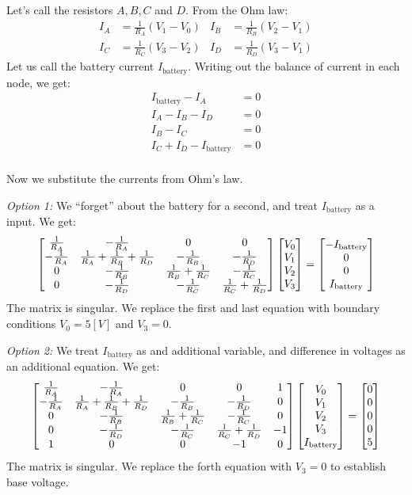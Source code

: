 \documentclass[12pt,class=article,crop=false,preview=false]{standalone}
\begin{document}
\begin{solution}
Let's call the resistors $A,B,C$ and $D$. From the Ohm law:
\begin{align*}
I_A &= \frac{1}{R_A}\left(V_1 - V_0\right) & I_B &= \frac{1}{R_B}\left(V_2 - V_1\right)\\
I_C &= \frac{1}{R_C}\left(V_3 - V_2\right) & I_D &= \frac{1}{R_D}\left(V_3 - V_1\right)
\end{align*}
Let us call the battery current $I_\text{battery}$. Writing out the balance of current in each node, we get:
\begin{align*}
I_\text{battery} - I_A &= 0\\
I_A - I_B - I_D &= 0\\
I_B - I_C &= 0\\
I_C + I_D - I_\text{battery} &= 0\\
\end{align*}

Now we substitute the currents from Ohm's law.

\emph{Option 1:} We ``forget'' about the battery for a second, and treat $I_\text{battery}$ as a input. We get:
\[
\left[\begin{matrix}
\frac{1}{R_A} & - \frac{1}{R_A} & 0 & 0\\
-\frac{1}{R_A} & \frac{1}{R_A}+\frac{1}{R_B}+\frac{1}{R_D} & -\frac{1}{R_B} & -\frac{1}{R_D}\\
0 & -\frac{1}{R_B} & \frac{1}{R_B} + \frac{1}{R_C} & -\frac{1}{R_C}\\
0 & -\frac{1}{R_D} & -\frac{1}{R_C} & \frac{1}{R_C} + \frac{1}{R_D}
\end{matrix}\right]\left[\begin{matrix}V_0\\V_1\\V_2\\V_3\end{matrix}\right] = \left[\begin{matrix}-I_\text{battery}\\0\\0\\I_\text{battery}\end{matrix}\right]
\]
The matrix is singular. We replace the first and last equation with boundary conditions $V_0=5[V]$ and $V_3=0$.

\emph{Option 2:} We treat $I_\text{battery}$ as and additional variable, and difference in voltages as an additional equation. We get:
\[
\left[\begin{matrix}
\frac{1}{R_A} & - \frac{1}{R_A} & 0 & 0 & 1\\
-\frac{1}{R_A} & \frac{1}{R_A}+\frac{1}{R_B}+\frac{1}{R_D} & -\frac{1}{R_B} & -\frac{1}{R_D} & 0\\
0 & -\frac{1}{R_B} & \frac{1}{R_B} + \frac{1}{R_C} & -\frac{1}{R_C} & 0\\
0 & -\frac{1}{R_D} & -\frac{1}{R_C} & \frac{1}{R_C} + \frac{1}{R_D} & -1\\
1 & 0 & 0 & -1 & 0
\end{matrix}\right]\left[\begin{matrix}V_0\\V_1\\V_2\\V_3\\I_\text{battery}\end{matrix}\right] = \left[\begin{matrix}0\\0\\0\\0\\5\end{matrix}\right]
\]
The matrix is singular. We replace the forth equation with $V_3=0$ to establish base voltage.


\end{solution}
\end{document}
